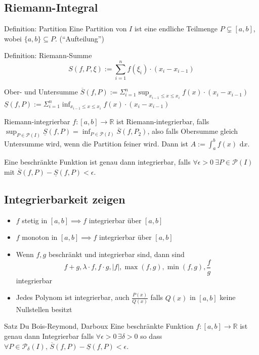\documentclass[a4paper,10pt]{article}
\def\R{\mathbb{R}}
\def\dx{\text{ d}x}
\begin{document}
\subsection{Riemann-Integral}
\begin{subbox}{Definition: Partition}
 Eine Partition von $I$ ist eine endliche Teilmenge $P \subsetneq [a,b]$, wobei $\{a,b\} \subseteq P$. (``Aufteilung'')
\end{subbox}
\begin{mainbox}{Definition: Riemann-Summe}
 $$S(f, P, \xi) := \sum_{i=1}^n f(\xi_i) \cdot (x_i - x_{i-1})$$
\end{mainbox}
\begin{subbox}{Ober- und Untersumme}
 $\overline{S}(f,P) := \Sigma_{i=1}^{n} \sup_{x_{i-1} \leq x \leq x_i} f(x) \cdot (x_i - x_{i-1})$ \\
 $\underline{S}(f,P) := \Sigma_{i=1}^{n} \inf_{x_{i-1} \leq x \leq x_i} f(x) \cdot (x_i - x_{i-1})$
\end{subbox}
\begin{mainbox}{Riemann-integrierbar}
 $f:[a,b] \to \R$ ist Riemann-integrierbar, falls $\sup_{P \in \mathcal{P}(I)} \underline{S}(f,P) = \inf_{P \in \mathcal{P}(I)}\overline{S}(f, P_2)$, also falls Obersumme gleich Untersumme wird, wenn die Partition feiner wird. Dann ist $A := \int_a^b f(x)\dx$.
\end{mainbox}

Eine beschränkte Funktion ist genau dann integrierbar, falls $\forall \epsilon > 0 \ \exists P \in \mathcal{P}(I)$ mit $\overline{S}(f, P) - \underline{S}(f, P) < \epsilon$.

\subsection{Integrierbarkeit zeigen}
\begin{itemize}
 \item $f$ stetig in $[a,b] \implies f$ integrierbar über $[a,b]$
 \item $f$ monoton in $[a,b] \implies f$ integrierbar über $[a,b]$
 \item Wenn $f,g$ beschränkt und integrierbar sind, dann sind
 $$f+g, \lambda \cdot f, f \cdot g, |f|, \max(f,g), \min(f,g), \frac{f}{g}$$ integrierbar
 \item Jedes Polynom ist integrierbar, auch $\frac{P(x)}{Q(x)}$ falls $Q(x)$ in $[a,b]$ keine Nullstellen besitzt
\end{itemize}

\begin{mainbox}{Satz Du Bois-Reymond, Darboux}
  Eine beschränkte Funktion $f: [a,b] \to \R$ ist genau dann Integrierbar falls $\forall \epsilon > 0 \, \exists \delta > 0$ so dass\\
  $\forall P \in \mathcal{P}_\delta(I), \, \overline{S}(f,P) - \underline{S}(f, P) < \epsilon$.
\end{mainbox}
\end{document}
